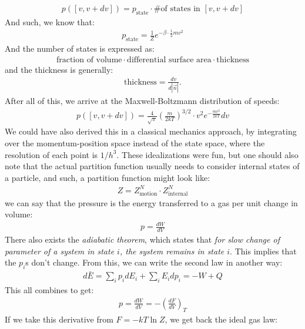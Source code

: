 \documentclass{article}
\begin{document}
\begin{align*}
  p\left( \left[v, v + dv\right]\right) = p_\text{state} \cdot \text{\# of states in } [v, v + dv]
\end{align*}
And such, we know that:
\begin{align*}
  p_\text{state} = \frac{1}{Z}e^{-\beta \cdot \frac{1}{2}mv^2}
\end{align*}
And the number of states is expressed as:
\begin{align*}
  \text{fraction of volume} \cdot \text{differential surface area} \cdot \text{thickness}
\end{align*}
and the thickness is generally:
\begin{align*}
  \text{thickness} = \frac{dv}{d|\vec{n}|}.
\end{align*}
After all of this, we arrive at the Maxwell-Boltzmann distribution of speeds:
\begin{align*}
  p \left( [v, v + dv]\right) = \frac{4}{\sqrt{\pi}} \left(\frac{m}{2kT}\right)^{3/2} \cdot v^2 e^{-\frac{mv^2}{2kT}}dv
\end{align*}
We could have also derived this in a classical mechanics approach, by integrating over the momentum-position space instead of the state space, where the resolution of each point is $1/h^3$.
\gap
These idealizations were fun, but one should also note that the actual partition function usually needs to consider internal states of a particle, and such, a partition function might look like:
\begin{align*}
  Z = Z_\text{motion}^N \cdot Z_{\text{internal}}^N
\end{align*}
 we can say that the pressure is the energy transferred to a gas per unit change in volume:
\begin{align*}
  p = \frac{dW}{dV}
\end{align*}
There also exists the \textit{adiabatic theorem}, which states that \textit{for slow change of parameter of a system in state $i$, the system remains in state $i$}. This implies that the $p_i$s don't change. From this, we can write the second law in another way:
\begin{align*}
  d\bar{E} = \sum_i p_i dE_i + \sum_i E_i dp_i = -W + Q
\end{align*}
This all combines to get:
\begin{align*}
  p = \frac{dW}{dV} = - \left(\frac{dF}{dV}\right)_T
\end{align*}
If we take this derivative from $F = -kT \ln Z$, we get back the ideal gas law:
\end{document}
